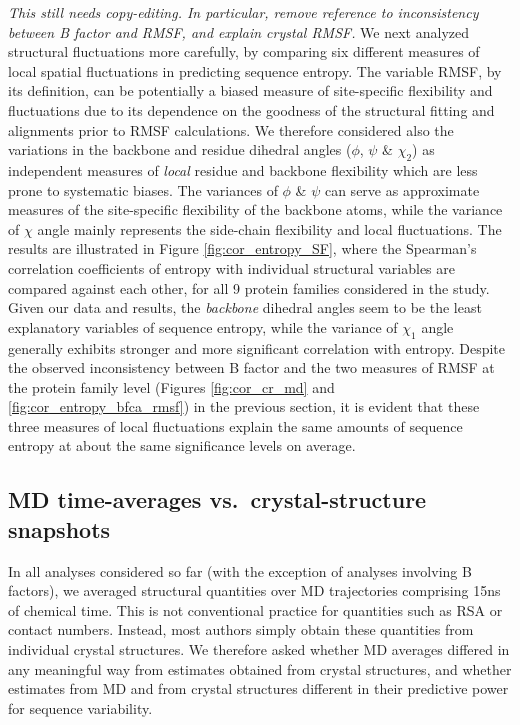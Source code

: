 \documentclass[12pt]{article}
\begin{document}
{\color{blue}\emph{This still needs copy-editing. In particular, remove reference to inconsistency between B factor and RMSF, and explain crystal RMSF.}
We next analyzed structural fluctuations more carefully, by comparing six different measures of local spatial fluctuations in predicting sequence entropy. The variable RMSF, by its definition, can be potentially a biased measure of site-specific flexibility and fluctuations due to its dependence on the goodness of the structural fitting and alignments prior to RMSF calculations. We therefore considered also the variations in the backbone and residue dihedral angles ($\phi$, $\psi$ \& $\chi_2$) as independent measures of {\it local} residue and backbone flexibility which are less prone to systematic biases. The variances of $\phi$ \& $\psi$ can serve as approximate measures of the site-specific flexibility of the backbone atoms, while the variance of $\chi$ angle mainly represents the side-chain flexibility and local fluctuations. The results are illustrated in Figure \ref{fig:cor_entropy_SF}, where the Spearman's correlation coefficients of entropy with individual structural variables are compared against each other, for all 9 protein families considered in the study. Given our data and results, the {\it backbone} dihedral angles seem to be the least explanatory variables of sequence entropy, while the variance of $\chi_1$ angle generally exhibits stronger and more significant correlation with entropy. Despite the observed inconsistency between B factor and the two measures of RMSF at the protein family level (Figures \ref{fig:cor_cr_md} and \ref{fig:cor_entropy_bfca_rmsf}) in the previous section, it is evident that these three measures of local fluctuations explain the same amounts of sequence entropy at about the same significance levels on average.
}

\subsection*{MD time-averages vs.\ crystal-structure snapshots}

In all analyses considered so far (with the exception of analyses involving B factors), we averaged structural quantities over MD trajectories comprising 15ns of chemical time. This is not conventional practice for quantities such as RSA or contact numbers. Instead, most authors simply obtain these quantities from individual crystal structures. We therefore asked whether MD averages differed in any meaningful way from estimates obtained from crystal structures, and whether estimates from MD and from crystal structures different in their predictive power for sequence variability.
\end{document}
